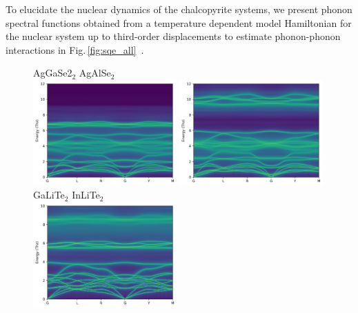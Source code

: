 To elucidate the nuclear dynamics of the chalcopyrite systems, we present phonon spectral functions obtained from a temperature dependent model Hamiltonian for the nuclear system up to third-order displacements to estimate phonon-phonon interactions in Fig.\,\ref{fig:sqe_all}~\cite{Hellman2013,Hellman2013b,Squires}.
%
\begin{figure}
	\centering
	AgGaSe2$_2$ \hspace{3.7cm} AgAlSe$_2$\\
	\includegraphics[width=0.49\textwidth]{./data/plots/spectral_functions/122.04.AgGaSe2.12.png}
	\includegraphics[width=0.49\textwidth]{./data/plots/spectral_functions/122.04.AgAlSe2.12.png}
	\\
	GaLiTe$_2$ \hspace{3.7cm} InLiTe$_2$\\
	\includegraphics[width=0.49\textwidth]{./data/plots/spectral_functions/122.04.GaLiTe2.png}

\end{figure}
